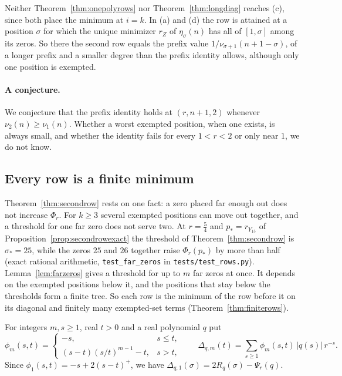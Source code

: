 \documentclass[11pt]{article}
\begin{document}
Neither Theorem~\ref{thm:onepolyrows} nor Theorem~\ref{thm:longdiag}
reaches (c), since both place the minimum at $i=k$.  In (a) and (d) the
row is attained at a position $\sigma$ for which the unique minimizer
$r_Z$ of $\eta_\sigma(n)$ has all of $[1,\sigma]$ among its zeros.  So there the second row equals the prefix value
$1/\nu_{\sigma+1}(n+1-\sigma)$, of a longer prefix and a smaller degree than
the prefix identity allows, although only one position is exempted.

\paragraph{A conjecture.}
We conjecture that the prefix identity holds at $(r,n+1,2)$ whenever
$\nu_2(n)\ge\nu_1(n)$.  Whether a worst exempted position, when one
exists, is always small, and whether the identity fails for every $1<r<2$
or only near $1$, we do not
know.

\subsection{Every row is a finite minimum}\label{sec:finiterows}

Theorem~\ref{thm:secondrow} rests on one fact: a zero placed far enough out
does not increase $\Phi_r$.  For $k\ge3$ several exempted positions can
move out together, and a threshold for one far zero does not serve two.  At
$r=\frac54$ and $p_*=r_{Y_{15}}$ of Proposition~\ref{prop:secondrowexact}
the threshold of Theorem~\ref{thm:secondrow} is $\sigma_*=25$, while the
zeros $25$ and $26$ together raise $\Phi_r(p_*)$ by more than half
(exact rational arithmetic, \texttt{test\_far\_zeros} in
\texttt{tests/test\_rows.py}).  Lemma~\ref{lem:farzeros} gives a threshold
for up to $m$ far zeros at once.  It depends on the exempted positions below
it, and the positions that stay below the thresholds form a finite tree.  So
each row is the minimum of the row before it on its diagonal and finitely
many exempted-set terms (Theorem~\ref{thm:finiterows}).

For integers $m,s\ge1$, real $t>0$ and a real polynomial $q$ put
\[
  \phi_m(s,t)=\begin{cases}-s,&s\le t,\\(s-t)(s/t)^{m-1}-t,&s>t,\end{cases}
  \qquad
  \Delta_{q,m}(t)=\sum_{s\ge1}\phi_m(s,t)\,|q(s)|\,r^{-s}.
\]
Since $\phi_1(s,t)=-s+2(s-t)^+$, we have
$\Delta_{q,1}(\sigma)=2R_q(\sigma)-\Psi_r(q)$.
\end{document}
